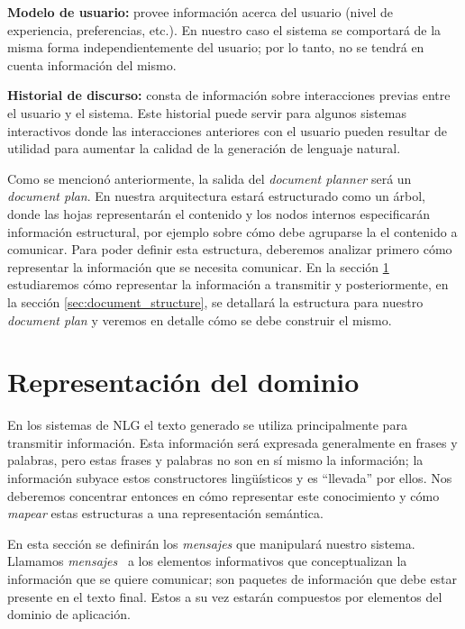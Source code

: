 \bigskip
\noindent
\textbf{Modelo de usuario:} provee información acerca del usuario (nivel de experiencia, preferencias, etc.). En nuestro caso el sistema se comportará de la misma forma independientemente del usuario; por lo tanto, no se tendrá en cuenta información del mismo.

\bigskip
\noindent
\textbf{Historial de discurso:} consta de información sobre interacciones previas entre el usuario y el sistema. Este historial puede servir para algunos sistemas interactivos donde las interacciones anteriores con el usuario pueden resultar de utilidad para aumentar la calidad de la generación de lenguaje natural.

\bigskip
Como se mencionó anteriormente, la salida del \textit{document planner} será un \textit{document plan}. En nuestra arquitectura estará estructurado como un árbol, donde las hojas representarán el contenido y los nodos internos especificarán información estructural, por ejemplo sobre cómo debe agruparse la el contenido a comunicar. Para poder definir esta estructura, deberemos analizar primero cómo representar la información que se necesita comunicar. En la sección \ref{sec:representacion_dominio} estudiaremos cómo representar la información a transmitir y posteriormente, en la sección \ref{sec:document_structure}, se detallará la estructura para nuestro \emph{document plan} y veremos en detalle cómo se debe construir el mismo.

\section{Representación del dominio}
\label{sec:representacion_dominio}

En los sistemas de NLG el texto generado se utiliza principalmente para transmitir información. Esta información será expresada generalmente en frases y palabras, pero estas frases y palabras no son en sí mismo la información; la información subyace estos constructores lingüísticos y es ``llevada'' por ellos. Nos deberemos concentrar entonces en cómo representar este conocimiento y cómo \textit{mapear} estas estructuras a una representación semántica. 

En esta sección se definirán los \emph{mensajes} que manipulará nuestro sistema. Llamamos \emph{mensajes}~\cite{reiter_dale} a los elementos informativos que conceptualizan la información que se quiere comunicar; son paquetes de información que debe estar presente en el texto final. Estos a su vez estarán compuestos por elementos del dominio de aplicación.


